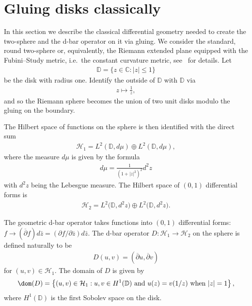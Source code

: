 \section{Gluing disks classically}\label{Section2}

In this section we describe the classical dif\/ferential geometry needed to create the two-sphere and the d-bar operator
on it via gluing.
We consider the standard, round two-sphere or, equivalently, the Riemann extended plane equipped with the Fubini--Study
metric, i.e.~the constant curvature metric, see~\cite{Ahlfors} for details.
Let
\begin{gather*}
{\mathbb D} = \{z\in{\mathbb C}: |z|\le 1\}
\end{gather*}
be the disk with radius one.
Identify the outside of ${\mathbb D}$ with ${\mathbb D}$ via
\begin{gather*}
z\mapsto\frac{1}{z},
\end{gather*}
and so the Riemann sphere becomes the union of two unit disks modulo the gluing on the boundary.

The Hilbert space of functions on the sphere is then identif\/ied with the direct sum
\begin{gather*}
\mathcal{H}_1 = L^2({\mathbb D}, d\mu) \oplus L^2({\mathbb D}, d\mu),
\end{gather*}
where the measure $d\mu$ is given by the formula
\begin{gather*}
d\mu = \frac{1}{(1+|z|^2)^2}d^2z
\end{gather*}
with $d^2z$ being the Lebesgue measure.
The Hilbert space of $(0,1)$ dif\/ferential forms is
\begin{gather*}
\mathcal{H}_2 = L^2\big({\mathbb D}, d^2z\big) \oplus L^2\big({\mathbb D}, d^2z\big).
\end{gather*}

The geometric d-bar operator takes functions into $(0,1)$ dif\/ferential forms: $f\to (\overline{\partial}f)d\bar z=
(\partial f/\partial\overline{z})d\bar z$.
The d-bar operator $D: \mathcal{H}_1\to\mathcal{H}_2$ on the sphere is def\/ined naturally to be
\begin{gather}
\label{dirac_op}
D(u,v) = (\overline{\partial}u, \overline{\partial}v)
\end{gather}
for $(u,v)\in\mathcal{H}_1$.
The domain of $D$ is given by
\begin{gather}
\label{dom_D}
\dom(D) = \left\{(u,v)\in\mathcal{H}_1: u,v\in H^1({\mathbb D})~\text{and}~u(z)=v(1/z)~\textrm{when}~|z|=1\right\},
\end{gather}
where $H^1({\mathbb D})$ is the f\/irst Sobolev space on the disk.

